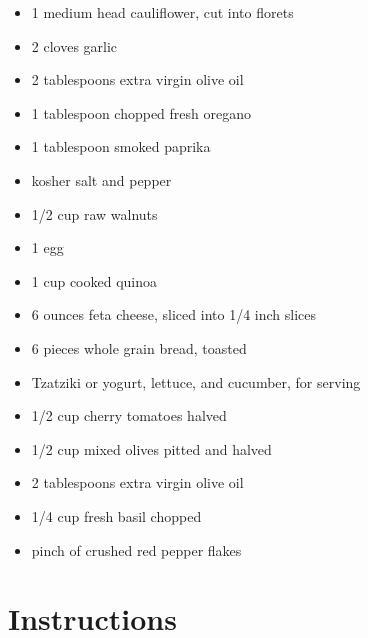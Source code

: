 \documentclass[
  letterpaper,
  DIV=11,
  numbers=noendperiod,
  titlepage=false]{scrreprt}
\providecommand{\tightlist}{%
  \setlength{\itemsep}{0pt}\setlength{\parskip}{0pt}}\usepackage{longtable,booktabs,array}
\begin{document}
\begin{itemize}
\tightlist
\item
  1 medium head cauliflower, cut into florets
\item
  2 cloves garlic
\item
  2 tablespoons extra virgin olive oil
\item
  1 tablespoon chopped fresh oregano
\item
  1 tablespoon smoked paprika
\item
  kosher salt and pepper
\item
  1/2 cup raw walnuts
\item
  1 egg
\item
  1 cup cooked quinoa
\item
  6 ounces feta cheese, sliced into 1/4 inch slices
\item
  6 pieces whole grain bread, toasted
\item
  Tzatziki or yogurt, lettuce, and cucumber, for serving
\item
  1/2 cup cherry tomatoes halved
\item
  1/2 cup mixed olives pitted and halved
\item
  2 tablespoons extra virgin olive oil
\item
  1/4 cup fresh basil chopped
\item
  pinch of crushed red pepper flakes
\end{itemize}

\section{Instructions}\label{instructions-90}
\end{document}
